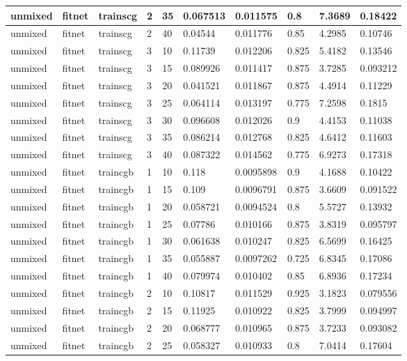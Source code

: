 \begin{longtable}{lllllllll}
unmixed & fitnet & trainscg & 2 & 35 & 0.067513 & 0.011575 & 0.8 & 7.3689 & 0.18422 \\ \hline 
unmixed & fitnet & trainscg & 2 & 40 & 0.04544 & 0.011776 & 0.85 & 4.2985 & 0.10746 \\ \hline 
unmixed & fitnet & trainscg & 3 & 10 & 0.11739 & 0.012206 & 0.825 & 5.4182 & 0.13546 \\ \hline 
unmixed & fitnet & trainscg & 3 & 15 & 0.089926 & 0.011417 & 0.875 & 3.7285 & 0.093212 \\ \hline 
unmixed & fitnet & trainscg & 3 & 20 & 0.041521 & 0.011867 & 0.875 & 4.4914 & 0.11229 \\ \hline 
unmixed & fitnet & trainscg & 3 & 25 & 0.064114 & 0.013197 & 0.775 & 7.2598 & 0.1815 \\ \hline 
unmixed & fitnet & trainscg & 3 & 30 & 0.096608 & 0.012026 & 0.9 & 4.4153 & 0.11038 \\ \hline 
unmixed & fitnet & trainscg & 3 & 35 & 0.086214 & 0.012768 & 0.825 & 4.6412 & 0.11603 \\ \hline 
unmixed & fitnet & trainscg & 3 & 40 & 0.087322 & 0.014562 & 0.775 & 6.9273 & 0.17318 \\ \hline 
unmixed & fitnet & traincgb & 1 & 10 & 0.118 & 0.0095898 & 0.9 & 4.1688 & 0.10422 \\ \hline 
unmixed & fitnet & traincgb & 1 & 15 & 0.109 & 0.0096791 & 0.875 & 3.6609 & 0.091522 \\ \hline 
unmixed & fitnet & traincgb & 1 & 20 & 0.058721 & 0.0094524 & 0.8 & 5.5727 & 0.13932 \\ \hline 
unmixed & fitnet & traincgb & 1 & 25 & 0.07786 & 0.010166 & 0.875 & 3.8319 & 0.095797 \\ \hline 
unmixed & fitnet & traincgb & 1 & 30 & 0.061638 & 0.010247 & 0.825 & 6.5699 & 0.16425 \\ \hline 
unmixed & fitnet & traincgb & 1 & 35 & 0.055887 & 0.0097262 & 0.725 & 6.8345 & 0.17086 \\ \hline 
unmixed & fitnet & traincgb & 1 & 40 & 0.079974 & 0.010402 & 0.85 & 6.8936 & 0.17234 \\ \hline 
unmixed & fitnet & traincgb & 2 & 10 & 0.10817 & 0.011529 & 0.925 & 3.1823 & 0.079556 \\ \hline 
unmixed & fitnet & traincgb & 2 & 15 & 0.11925 & 0.010922 & 0.825 & 3.7999 & 0.094997 \\ \hline 
unmixed & fitnet & traincgb & 2 & 20 & 0.068777 & 0.010965 & 0.875 & 3.7233 & 0.093082 \\ \hline 
unmixed & fitnet & traincgb & 2 & 25 & 0.058327 & 0.010933 & 0.8 & 7.0414 & 0.17604 \\ \hline 

\end{longtable}
